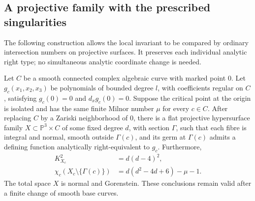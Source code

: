 \subsection{A projective family with the prescribed singularities}
\label{sec:compactification}

The following construction allows the local invariant to be compared by
ordinary intersection numbers on projective surfaces.  It preserves each
individual analytic right type; no simultaneous analytic coordinate
change is needed.

\begin{lemma}
\label{lem:compactification}
Let $C$ be a smooth connected complex algebraic curve with marked point
$0$.  Let $g_c(x_1,x_2,x_3)$ be polynomials of bounded degree $l$, with
coefficients regular on $C$, satisfying $g_c(0)=0$ and
$d_xg_c(0)=0$.  Suppose the critical point at the origin is isolated and
has the same finite Milnor number $\mu$ for every $c\in C$.
After replacing $C$ by a Zariski neighborhood of $0$, there is a flat
projective hypersurface family $X\subset\mathbb P^3\times C$ of some
fixed degree $d$, with section $\Gamma$, such that each fibre is integral
and normal, smooth outside $\Gamma(c)$, and its germ at $\Gamma(c)$
admits a defining function analytically right-equivalent to $g_c$.
Furthermore,
\begin{align}
 K_{X_c}^2&=d(d-4)^2,\label{eq:compact-canonical-square}\\
 \chi_c(X_c\setminus\{\Gamma(c)\})
   &=d(d^2-4d+6)-\mu-1.\label{eq:compact-euler}
\end{align}
The total space $X$ is normal and Gorenstein.  These conclusions remain
valid after a finite change of smooth base curves.
\end{lemma}

